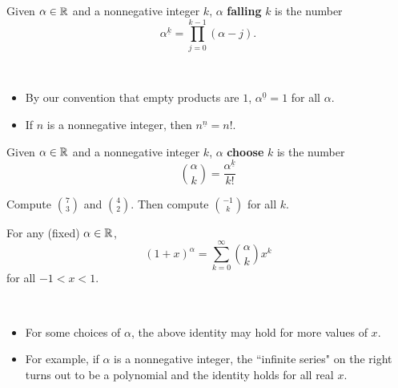 \setcounter{chapter}{10}
\setcounter{section}{10}
\setcounter{theorem}{0}
\setcounter{equation}{0}


\begin{definition}
Given $\alpha\in\mathbb R$ and a nonnegative integer $k$, $\alpha$ \textbf{falling} $k$ is the number
\begin{equation*}
\alpha^{\underline{k}} = \prod_{j=0}^{k-1}(\alpha-j).
\end{equation*}
\end{definition}
\begin{remark}\,
\begin{itemize}
\item By our convention that empty products are $1$, $\alpha^{\underline{0}}=1$ for all $\alpha$.
\item If $n$ is a nonnegative integer, then $n^{\underline{n}}=n!$.
\end{itemize}
\end{remark}


\begin{definition}
Given $\alpha\in\mathbb R$ and a nonnegative integer $k$, $\alpha$ \textbf{choose} $k$ is the number
\begin{equation*}
\binom{\alpha}{k} = \frac{\alpha^{\underline{k}}}{k!}
\end{equation*}
\end{definition}

\begin{example}
Compute $\binom{7}{3}$ and $\binom{4}{2}$.
Then compute $\binom{-1}{k}$ for all $k$.
\end{example}
\ifdefined\SOLUTION
{} 
\fi
\newpage

\begin{theorem}
For any (fixed) $\alpha\in\mathbb R$,
\begin{equation*}
(1+x)^\alpha = \sum_{k=0}^\infty\binom{\alpha}{k}x^k
\end{equation*}
for all $-1< x< 1$.
\end{theorem}
\begin{remark}\,
\begin{itemize}
\item For some choices of $\alpha$, the above identity may hold for more values of $x$.
\item For example, if $\alpha$ is a nonnegative integer, the ``infinite series" on the right turns out to be a polynomial and the identity holds for all real $x$.
\end{itemize}
\end{remark}

